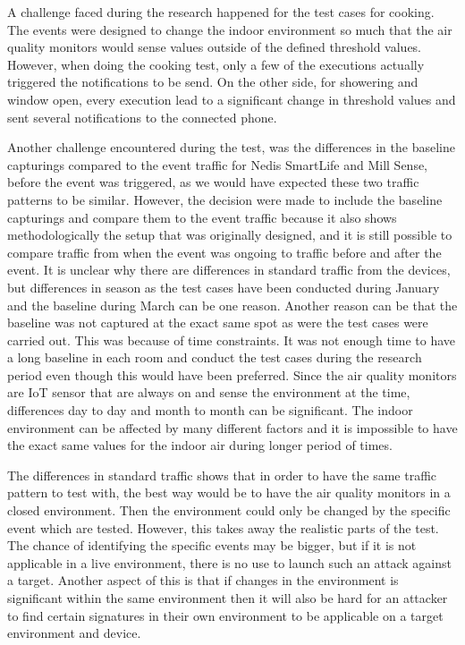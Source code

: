 A challenge faced during the research happened for the test cases for cooking. The events were designed to change the indoor environment so much that the air quality monitors would sense values outside of the defined threshold values. However, when doing the cooking test, only a few of the executions actually triggered the notifications to be send. On the other side, for showering and window open, every execution lead to a significant change in threshold values and sent several notifications to the connected phone. 

Another challenge encountered during the test, was the differences in the baseline capturings compared to the event traffic for Nedis SmartLife and Mill Sense, before the event was triggered, as we would have expected these two traffic patterns to be similar. However, the decision were made to include the baseline capturings and compare them to the event traffic because it also shows methodologically the setup that was originally designed, and it is still possible to compare traffic from when the event was ongoing to traffic before and after the event. It is unclear why there are differences in standard traffic from the devices, but differences in season as the test cases have been conducted during January and the baseline during March can be one reason. Another reason can be that the baseline was not captured at the exact same spot as were the test cases were carried out. This was because of time constraints. It was not enough time to have a long baseline in each room and conduct the test cases during the research period even though this would have been preferred. Since the air quality monitors are \gls{IoT} sensor that are always on and sense the environment at the time, differences day to day and month to month can be significant. The indoor environment can be affected by many different factors and it is impossible to have the exact same values for the indoor air during longer period of times. 

The differences in standard traffic shows that in order to have the same traffic pattern to test with, the best way would be to have the air quality monitors in a closed environment. Then the environment could only be changed by the specific event which are tested. However, this takes away the realistic parts of the test. The chance of identifying the specific events may be bigger, but if it is not applicable in a live environment, there is no use to launch such an attack against a target. Another aspect of this is that if changes in the environment is significant within the same environment then it will also be hard for an attacker to find certain signatures in their own environment to be applicable on a target environment and device. 